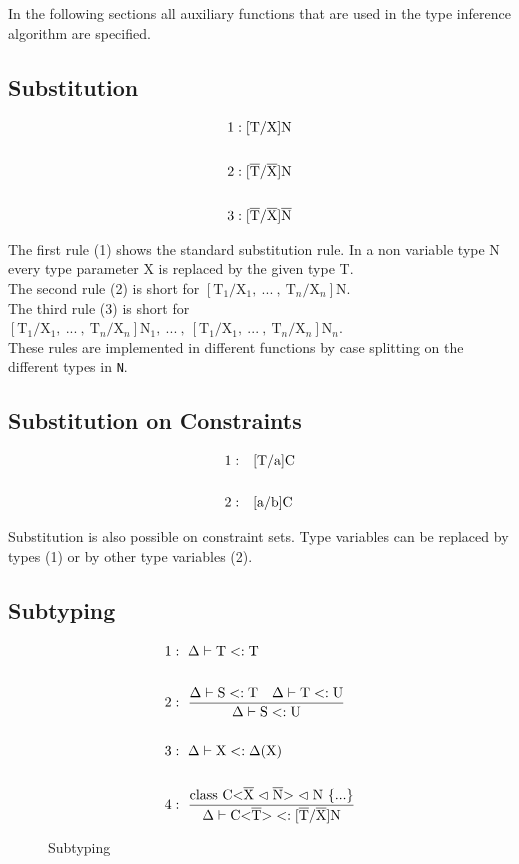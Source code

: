 In the following sections all auxiliary functions that are used in the type inference algorithm are specified.

\subsection{Substitution}

\begin{align*}
1&: \text{[T/X]N}
\\
\\
2&: \text{[}\overline{\text{T}}/\overline{\text{X}}\text{]N}
\\
\\
3&: \text{[}\overline{\text{T}}/\overline{\text{X}}\text{]}\overline{\text{N}}
\end{align*}

The first rule (1) shows the standard substitution rule. In a non variable type N every type parameter X is replaced by the given type T.
\\
The second rule (2) is short for $[\text{T}_1/\text{X}_1, \ ... \ , \ \text{T}_n/\text{X}_n]\text{N}$.
\\
The third rule (3) is short for $[\text{T}_1/\text{X}_1, \ ... \ , \ \text{T}_n/\text{X}_n]\text{N}_1, \ ... \ , \ [\text{T}_1/\text{X}_1, \ ... \ , \ \text{T}_n/\text{X}_n]\text{N}_n$.
\\
These rules are implemented in different functions by case splitting on the different types in \verb|N|.

\subsection{Substitution on Constraints}

\begin{align*}
    1:& \quad \text{[T/a]C}\\
    \\
    2:& \quad \text{[a/b]C}
\end{align*}

Substitution is also possible on constraint sets. Type variables can be replaced by types (1) or by other type variables (2).

\subsection{Subtyping}

\begin{figure}[tp]
    \begin{align*}
1&: \ \Delta \vdash \text{T} <: \text{T}
\\
\\
2&: \ \frac{\Delta \vdash \text{S} <: \text{T} \quad \Delta \vdash \text{T} <: \text{U}}{\Delta \vdash \text{S} <: \text{U}}
\\
\\
3&: \ \Delta \vdash \text{X} <: \Delta(\text{X})
\\
\\
4&: \ \frac{\text{class C<} \overline{\text{X}} \vartriangleleft \overline{\text{N}} \text{>} \vartriangleleft \text{N} \ \{...\}}{\Delta \vdash \text{C<}\overline{\text{T}}\text{>} <: \text{[}\overline{\text{T}}/\overline{\text{X}}\text{]N}}
    \end{align*}
    \caption{Subtyping}
    \label{subtyping}
\end{figure}

